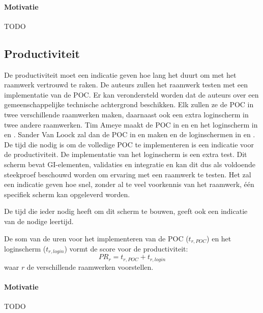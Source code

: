 \paragraph{Motivatie}
TODO

\subsection{Productiviteit}
\label{sec:vergelijking-productiviteit}
De productiviteit moet een indicatie geven hoe lang het duurt om met het raamwerk vertrouwd te raken.
De auteurs zullen het raamwerk testen met een implementatie van de POC.
Er kan verondersteld worden dat de auteurs over een gemeenschappelijke technische achtergrond beschikken.
Elk zullen ze de POC in twee verschillende raamwerken maken,  daarnaast ook een extra loginscherm in twee andere raamwerken.
Tim Ameye maakt de POC in \jqm{} en \lungo{} en het loginscherm in \st{} en \kendo{}.
Sander Van Loock zal dan de POC in \st{} en \kendo{} maken en de loginschermen in \jqm{} en \lungo{}.
De tijd die nodig is om de volledige POC te implementeren is een indicatie voor de productiviteit. 
De implementatie van het loginscherm is een extra test.
Dit scherm bevat GI-elementen, validaties en  integratie en kan dit dus als voldoende steekproef beschouwd worden om ervaring met een raamwerk te testen.
Het zal een indicatie geven hoe snel,  zonder al te veel voorkennis van het raamwerk,  één specifiek scherm kan opgeleverd worden.

De tijd die ieder nodig heeft om dit scherm te bouwen, geeft ook een indicatie van de nodige leertijd.


De som van de uren voor het implementeren van de POC ($t_{r,POC}$) en het loginscherm ($t_{r,login}$) vormt de score voor de productiviteit:
\begin{equation}
  PR_r = {t_{r,POC} + t_{r,login}}
  \label{eq:productiviteit}
\end{equation}
waar $r$ de verschillende raamwerken voorstellen.

\paragraph{Motivatie}
TODO

